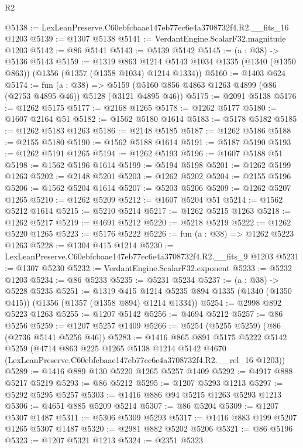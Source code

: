 \begin{lexlean}{R2}
\begin{coremodule}
@5138 := LexLeanPreserve.C60ebfcbaae147eb77ec6e4a3708732f4.R2.__fits_16 @1203
@5139 := @1307 @5138
@5141 := VerdantEngine.ScalarF32.magnitude @1203
@5142 := @86 @5141
@5143 := @5139 @5142
@5145 := (a : @38) -> @5136 @5143
@5159 := @1319
    @863
    @1214
    @5143
    @1034
    @1335
    (@1340 (@1350 @863))
    (@1356 (@1357 (@1358 @1034) @1214 @1334))
@5160 := @1403 @624
@5174 := fun (a : @38) =>
  @5159 (@5160 @856 @4863 @1263 @4899 (@86 (@2753 @4895 @46)) @5128 (@3121 @4895 @46))
@5175 := @2091 @5138
@5176 := @1262 @5175
@5177 := @2168 @1265
@5178 := @1262 @5177
@5180 := @1607 @2164 @51
@5182 := @1562 @5180 @1614
@5183 := @5178 @5182
@5185 := @1262 @5183 @1263
@5186 := @2148 @5185
@5187 := @1262 @5186
@5188 := @2155 @5180
@5190 := @1562 @5188 @1614
@5191 := @5187 @5190
@5193 := @1262 @5191 @1265
@5194 := @1262 @5193
@5196 := @1607 @5188 @51
@5198 := @1562 @5196 @1614
@5199 := @5194 @5198
@5201 := @1262 @5199 @1263
@5202 := @2148 @5201
@5203 := @1262 @5202
@5204 := @2155 @5196
@5206 := @1562 @5204 @1614
@5207 := @5203 @5206
@5209 := @1262 @5207 @1265
@5210 := @1262 @5209
@5212 := @1607 @5204 @51
@5214 := @1562 @5212 @1614
@5215 := @5210 @5214
@5217 := @1262 @5215 @1263
@5218 := @1262 @5217
@5219 := @4691 @5212
@5220 := @5218 @5219
@5222 := @1262 @5220 @1265
@5223 := @5176 @5222
@5226 := fun (a : @38) => @1262 @5223 @1263
@5228 := @1304 @415 @1214
@5230 := LexLeanPreserve.C60ebfcbaae147eb77ec6e4a3708732f4.R2.__fits_9 @1203
@5231 := @1307 @5230
@5232 := VerdantEngine.ScalarF32.exponent
@5233 := @5232 @1203
@5234 := @86 @5233
@5235 := @5231 @5234
@5237 := (a : @38) -> @5228 @5235
@5251 := @1319
    @415
    @1214
    @5235
    @894
    @1335
    (@1340 (@1350 @415))
    (@1356 (@1357 (@1358 @894) @1214 @1334))
@5254 := @2998 @892 @5223 @1263
@5255 := @1207 @5142
@5256 := @4694 @5212
@5257 := @86 @5256
@5259 := @1207 @5257 @1409
@5266 := @5254 (@5255 @5259) (@86 (@2736 @5141 @5256 @46))
@5283 := @1416
    @865
    @891
    @5175
    @5222
    @5142
    @5259
    (@4714
      @863
      @225
      @1265
      @5138
      @1214
      @5142
      @4670
      (LexLeanPreserve.C60ebfcbaae147eb77ec6e4a3708732f4.R2.__rel_16 @1203))
@5289 := @1416 @889 @130 @5220 @1265 @5257 @1409
@5292 := @4917 @888 @5217 @5219
@5293 := @86 @5212
@5295 := @1207 @5293 @1213
@5297 := @5292 @5295 @5257
@5303 := @1416 @886 @94 @5215 @1263 @5293 @1213
@5306 := @4651 @885 @5209 @5214
@5307 := @86 @5204
@5309 := @1207 @5307 @1487
@5311 := @5306 @5309 @5293
@5317 := @1416 @883 @199 @5207 @1265 @5307 @1487
@5320 := @2981 @882 @5202 @5206
@5321 := @86 @5196
@5323 := @1207 @5321 @1213
@5324 := @2351 @5323

\end{coremodule}
\end{lexlean}
